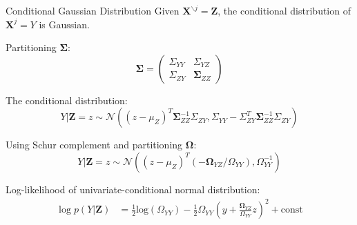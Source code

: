 \documentclass[11pt]{beamer}
\def\bX{\mathbf{X}}
\newcommand{\backupend}{
	\addtocounter{framenumberappendix}{-\value{framenumber}}
	\addtocounter{framenumber}{\value{framenumberappendix}} 
}
\begin{document}
										\begin{frame}{Conditional Gaussian Distribution}
											Given $\bX^{\backslash j} = \bm Z$, the conditional distribution of $\bX^j = Y$ is Gaussian.
											
											Partitioning $\bm \Sigma$:
											$$\bm \Sigma = \begin{pmatrix}
												\Sigma_{YY} & \Sigma_{YZ}\\
												\Sigma_{ZY} & \bm \Sigma_{ZZ}
											\end{pmatrix}$$
											
											The conditional distribution:
											$$Y|\bm Z=z \sim \mathcal N\left((z-\mu_Z)^T \bm \Sigma_{ZZ}^{-1} \Sigma_{ZY}, \Sigma_{YY} - \Sigma_{ZY}^T \bm \Sigma_{ZZ}^{-1} \Sigma_{ZY}\right)$$
											
											Using Schur complement and partitioning $\bm \Omega$:
											$$Y|\bm Z=z \sim \mathcal N\left((z-\mu_Z)^T (-\bm \Omega_{YZ}/\Omega_{YY}), \Omega_{YY}^{-1}\right)$$
											
											Log-likelihood of univariate-conditional normal distribution:
											\begin{equation*}
												\begin{split}
													\log p(Y|\bm Z) &= \frac{1}{2} \text{log}(\Omega_{YY}) - \frac{1}{2} \Omega_{YY} \left (y + \frac{\bm \Omega_{YZ}}{\Omega_{YY}} z \right )^2 + \text{const}
												\end{split}
											\end{equation*}
										\end{frame}
										
									\backupend
									
\end{document}
